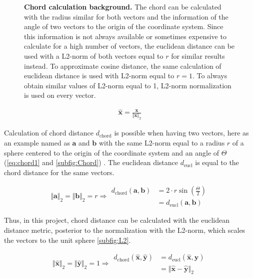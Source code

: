 \begin{figure}[!hbt]
\begin{subfigure}[b]{0.475\textwidth}
    \end{subfigure}
    \caption[Chord calculation background]{\textbf{Chord calculation background.} The chord can be calculated with the radius similar for both vectors and the information of the angle of two vectors to the origin of the coordinate system. Since this information is not always available or sometimes expensive to calculate for a high number of vectors, the euclidean distance can be used with a L2-norm of both vectors equal to $r$ for similar results instead. To approximate cosine distance, the same calculation of euclidean distance is used with L2-norm equal to $r = 1$. To always obtain similar values of L2-norm equal to 1, L2-norm normalization is used on every vector.}
    \label{fig:L2_Normalisation_Background}
\end{figure}

\begin{equation}\label{eq:norm2}
    \begin{aligned}
        \mathbf{\hat{x}} = \frac{\mathbf{x}}{\Vert\mathbf{x}\Vert_2}
    \end{aligned}
\end{equation}

Calculation of chord distance $d_{\text{chord}}$ is possible when having two vectors, here as an example named as $\mathbf{a}$ and $\mathbf{b}$ with the same L2-norm equal to a radius $r$ of a sphere centered to the origin of the coordinate system and an angle of $\Theta$ (\autoref{eq:chord1} and \autoref{subfig:Chord}) \autocite{maor_trigonometric_2013}. The euclidean distance $d_{\text{eucl}}$ is equal to the chord distance for the same vectors.

\begin{equation}\label{eq:chord1}
    \Vert\mathbf{a}\Vert_2 = \Vert\mathbf{b}\Vert_2 = r \Rightarrow 
    \begin{aligned}
        d_{\text{chord}}(\mathbf{a},\mathbf{b}) &= 2 \cdot r \sin \left(\frac{\Theta}{2}\right)\\
        &= d_{\text{eucl}}(\mathbf{a},\mathbf{b})
    \end{aligned}
\end{equation}

Thus, in this project, chord distance can be calculated with the euclidean distance metric, posterior to the normalization with the L2-norm, which scales the vectors to the unit sphere \autoref{subfig:L2}. 

\begin{equation}\label{eq:chord2}
    \Vert\mathbf{\hat{x}}\Vert_2 = \Vert\mathbf{\hat{y}}\Vert_2 = 1 \Rightarrow 
    \begin{aligned}
        d_{\text{chord}}(\mathbf{\hat{x}},\mathbf{\hat{y}}) &= d_{\text{eucl}}(\mathbf{\hat{x}},\mathbf{\hat{y}})\\
        &= \Vert\mathbf{\hat{x}} - \mathbf{\hat{y}}\Vert_2
    \end{aligned}
\end{equation}

